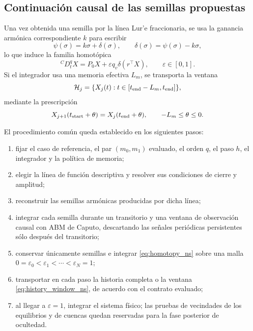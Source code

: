 \documentclass[journal]{IEEEtran}
\begin{document}
\subsection{Continuación causal de las semillas propuestas}

Una vez obtenida una semilla por la línea Lur'e fraccionaria, se usa la
ganancia armónica correspondiente \(k\) para escribir
\begin{equation}
\label{eq:delta_ns}
\psi(\sigma)=k\sigma+\delta(\sigma),
\qquad
\delta(\sigma)=\psi(\sigma)-k\sigma,
\end{equation}
lo que induce la familia homotópica
\begin{equation}
\label{eq:homotopy_ns}
{}^{C}D_t^qX=P_0X+\varepsilon q_v\delta(r^\top X),
\qquad \varepsilon\in[0,1].
\end{equation}
Si el integrador usa una memoria efectiva $L_m$, se transporta la ventana
\begin{equation}
\label{eq:history_window_ns}
\mathcal H_j=\{X_j(t):t\in[t_{\rm end}-L_m,t_{\rm end}]\},
\end{equation}
mediante la prescripción
\begin{equation}
\label{eq:history_transfer_ns}
X_{j+1}(t_{\rm start}+\theta)=X_j(t_{\rm end}+\theta),
\qquad -L_m\leq\theta\leq0.
\end{equation}

El procedimiento común queda establecido en los siguientes pasos:
\begin{enumerate}[leftmargin=1.8em,label=\arabic*)]
\item fijar el caso de referencia, el par \((m_0,m_1)\) evaluado, el orden $q$, el paso $h$, el integrador y la política de memoria;
\item elegir la línea de función descriptiva y resolver sus condiciones de cierre y amplitud;
\item reconstruir las semillas armónicas producidas por dicha línea;
\item integrar cada semilla durante un transitorio y una ventana de observación causal con ABM de Caputo, descartando las señales periódicas persistentes sólo después del transitorio;
\item conservar únicamente semillas  e integrar \eqref{eq:homotopy_ns} sobre una malla $0=\varepsilon_0<\varepsilon_1<\cdots<\varepsilon_N=1$;
\item transportar en cada paso la historia completa o la ventana \eqref{eq:history_window_ns}, de acuerdo con el contrato evaluado;
\item al llegar a $\varepsilon=1$, integrar el sistema físico; las pruebas de vecindades de los equilibrios y de cuencas quedan reservadas para la fase posterior de ocultedad.
\end{enumerate}
\end{document}
